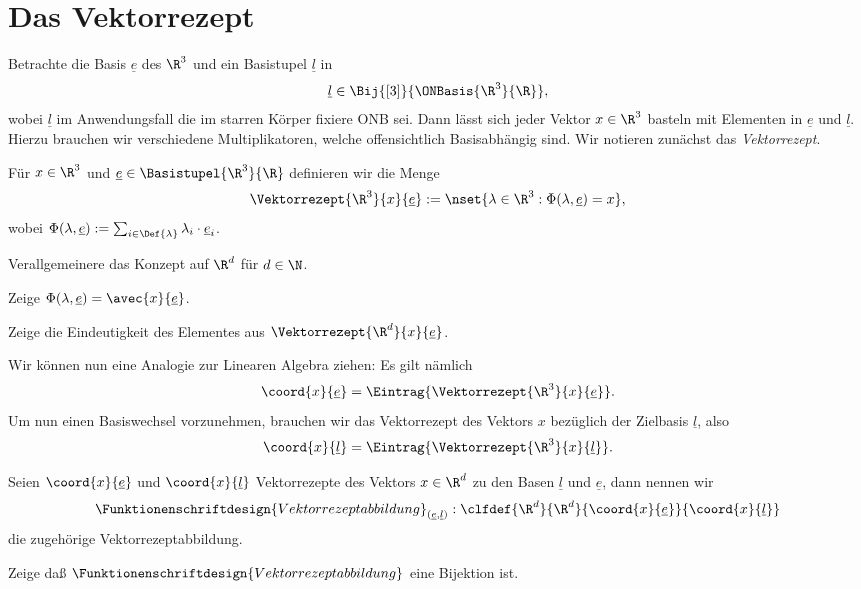 \documentclass[../WiSe22ANA3.tex]{subfiles}
\begin{document}
	\section{Das Vektorrezept}
		Betrachte die Basis $\underline e$ des $\R^3$ und ein Basistupel $\underline l$ in
		\begin{align*}
			\underline l\in\Bij{[3]}{\ONBasis{\R^3}{\R}},
		\end{align*}
		wobei $\underline l$ im Anwendungsfall die im starren Körper fixiere ONB sei. Dann lässt sich jeder Vektor $x\in\R^3$ basteln mit Elementen in $\underline e$ und $\underline l$. Hierzu brauchen wir verschiedene Multiplikatoren, welche offensichtlich Basisabhängig sind. Wir notieren zunächst das \emph{Vektorrezept}. 
		\begin{info}[Vektorrezept]
			Für $x\in\R^3$ und $\underline e\in\Basistupel{\R^3}{\R}$ definieren wir die Menge
			$$\Vektorrezept{\R^3}{x}{\underline e}:=\nset{\lambda\in\R^3:\Phi(\lambda,\underline e)=x},$$
			wobei $\Phi(\lambda,\underline e):=\sum_{i\in\Def{\lambda}}\lambda_i\cdot\underline e_i$. 
		\end{info}
		\begin{Aufgabe}
			\nr Verallgemeinere das Konzept auf $\R^d$ für $d\in\N$.
			
			\nr Zeige $\Phi(\lambda,\underline e)=\avec{x}{\underline e}$. 
			
			\nr Zeige die Eindeutigkeit des Elementes aus $\Vektorrezept{\R^d}{x}{\underline e}$.
		\end{Aufgabe}
		Wir können nun eine Analogie zur Linearen Algebra ziehen: Es gilt nämlich 
		$$\coord{x}{\underline e}=\Eintrag{\Vektorrezept{\R^3}{x}{\underline e}}.$$
		Um nun einen Basiswechsel vorzunehmen, brauchen wir das Vektorrezept des Vektors $x$ bezüglich der Zielbasis $\underline l$, also
		$$\coord{x}{\underline l}=\Eintrag{\Vektorrezept{\R^3}{x}{\underline l}}.$$
		\begin{info}
			Seien $\coord{x}{\underline e}$ und $\coord{x}{\underline l}$ Vektorrezepte des Vektors $x\in\R^d$ zu den Basen $\underline l$ und $\underline e$, dann nennen wir 
			$$\Funktionenschriftdesign{Vektorrezeptabbildung}_{(\underline e,\underline l)}:\clfdef{\R^d}{\R^d}{\coord{x}{\underline e}}{\coord{x}{\underline l}}$$
			die zugehörige Vektorrezeptabbildung.
		\end{info}
		\begin{Aufgabe}
			\nr Zeige daß $\Funktionenschriftdesign{Vektorrezeptabbildung}$ eine Bijektion ist. 
		\end{Aufgabe}
\end{document}
